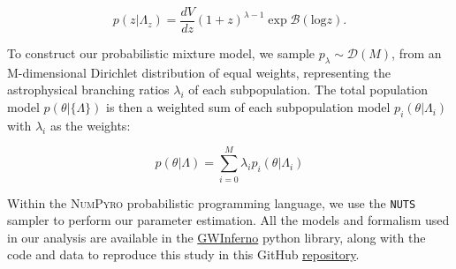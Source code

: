 \begin{equation}
    p(z|\Lambda_z) = \frac{dV}{dz} (1+z)^{\lambda - 1} \exp \mathcal{B}(\text{log}z).
\end{equation}

To construct our probabilistic mixture model, we sample $p_{\lambda} \sim \mathcal{D}(M)$, from an M-dimensional Dirichlet distribution of equal weights, representing the astrophysical branching ratios $\lambda_{i}$ of each subpopulation. The total population model $p(\theta | \{\Lambda\})$ is then a weighted sum of each subpopulation model $p_i(\theta|\Lambda_i)$ with $\lambda_i$ as the weights:

\begin{equation} \label{totmixmod}
p(\theta|\Lambda) = \sum_{i=0}^{M} \lambda_i p_i(\theta | \Lambda_i)
\end{equation}

Within the \textsc{NumPyro} \citep{1810.09538,1912.11554} probabilistic programming language, we use the \texttt{NUTS} \citep{1111.4246} sampler to perform our parameter estimation. All the models and formalism used in our analysis are available in the \href{https://github.com/FarrOutLab/GWInferno}{GWInferno} python library, along with the code and data to reproduce this study in this GitHub \href{https://github.com/jaxeng/CosmicCousins}{repository}. 


